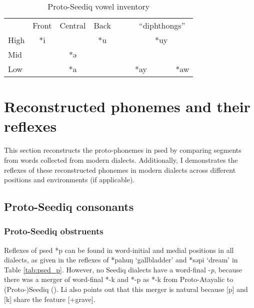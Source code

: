\begin{table}[!htbp]
\centering
\caption{Proto-Seediq vowel inventory}
\label{tab:psedV}
\begin{tabular}{lcccccccc}
\cline{1-4} \cline{7-9}
     & Front & Central & Back &  &  & \multicolumn{3}{c}{``diphthongs''} \\ \cline{1-4} \cline{7-9}
High & *i    &         & *u   &  &  &            & *uy       &           \\
Mid  &       & *ə      &      &  &  &            &           &           \\
Low  &       & *a      &      &  &  & *ay        &           & *aw       \\ \cline{1-4} \cline{7-9}
\end{tabular}
\end{table}

\section{Reconstructed phonemes and their reflexes} \label{sec:psed_CandV}

This section reconstructs the proto-phonemes in \acl{psed} by comparing segments from words collected from modern dialects. Additionally, I demonstrates the reflexes of these reconstructed phonemes in modern dialects across different positions and environments (if applicable).

\subsection{Proto-Seediq consonants} \label{sec:psedC}

\subsubsection{Proto-Seediq obstruents}

Reflexes of \acl{psed} *p can be found in word-initial and medial positions in all dialects, as given in the reflexes of *pahuŋ `gallbladder' and *səpi `dream' in Table \ref{tab:psed_p}. However, no Seediq dialects have a word-final -\textit{p}, because there was a merger of word-final *-k and *-p as *-k from Proto-Atayalic to (Proto-)Seediq (\cite{li1981paic}). Li also points out that this merger is natural because [p] and [k] share the feature [+grave]. 

